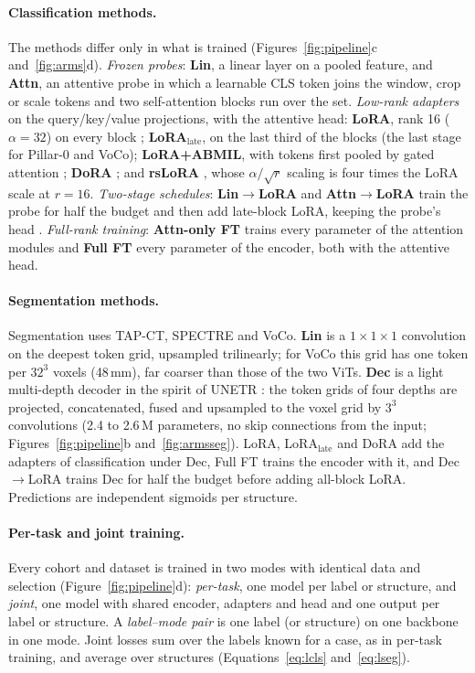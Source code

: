 \paragraph{Classification methods.}\label{sec:ladder} The methods differ only in what is trained (Figures~\ref{fig:pipeline}c and~\ref{fig:arms}d). \emph{Frozen probes}: \textbf{Lin}, a linear layer on a pooled feature, and \textbf{Attn}, an attentive probe \citep{bardes2024vjepa,chen2024cae} in which a learnable CLS token joins the window, crop or scale tokens and two self-attention blocks run over the set. \emph{Low-rank adapters} on the query/key/value projections, with the attentive head: \textbf{LoRA}, rank 16 ($\alpha=32$) on every block \citep{hu2022lora}; \textbf{LoRA$_{\text{late}}$}, on the last third of the blocks (the last stage for Pillar-0 and VoCo); \textbf{LoRA+ABMIL}, with tokens first pooled by gated attention \citep{ilse2018abmil}; \textbf{DoRA} \citep{liu2024dora}; and \textbf{rsLoRA} \citep{kalajdzievski2023rslora}, whose $\alpha/\sqrt{r}$ scaling is four times the LoRA scale at $r=16$. \emph{Two-stage schedules}: \textbf{Lin$\to$LoRA} and \textbf{Attn$\to$LoRA} train the probe for half the budget and then add late-block LoRA, keeping the probe's head \citep{kumar2022lpft}. \emph{Full-rank training}: \textbf{Attn-only FT} trains every parameter of the attention modules \citep{touvron2022three} and \textbf{Full FT} every parameter of the encoder, both with the attentive head.

\paragraph{Segmentation methods.}\label{sec:segmethods} Segmentation uses TAP-CT, SPECTRE and VoCo. \textbf{Lin} is a $1\times1\times1$ convolution on the deepest token grid, upsampled trilinearly; for VoCo this grid has one token per $32^3$ voxels (48\,mm), far coarser than those of the two ViTs. \textbf{Dec} is a light multi-depth decoder in the spirit of UNETR \citep{hatamizadeh2022unetr}: the token grids of four depths are projected, concatenated, fused and upsampled to the voxel grid by $3^3$ convolutions (2.4 to 2.6\,M parameters, no skip connections from the input; Figures~\ref{fig:pipeline}b and~\ref{fig:armsseg}). LoRA, LoRA$_{\text{late}}$ and DoRA add the adapters of classification under Dec, Full FT trains the encoder with it, and Dec$\to$LoRA trains Dec for half the budget before adding all-block LoRA. Predictions are independent sigmoids per structure.

\paragraph{Per-task and joint training.} Every cohort and dataset is trained in two modes with identical data and selection (Figure~\ref{fig:pipeline}d): \emph{per-task}, one model per label or structure, and \emph{joint}, one model with shared encoder, adapters and head and one output per label or structure. A \emph{label--mode pair} is one label (or structure) on one backbone in one mode. Joint losses sum over the labels known for a case, as in per-task training, and average over structures (Equations~\ref{eq:lcls} and~\ref{eq:lseg}).
